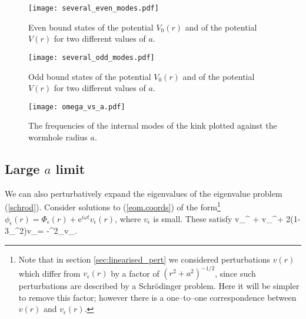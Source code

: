 

\begin{figure}
\texttt{[image: several\_even\_modes.pdf]}
\caption{\label{fig:even_states} Even bound states of the potential $V_0(r)$ and of the potential $V(r)$ for two different values of $a$.}
\end{figure}

\begin{figure}
\texttt{[image: several\_odd\_modes.pdf]}
\caption{\label{fig:odd_states} Odd bound states of the potential $V_0(r)$ and of the potential $V(r)$ for two different values of $a$.}
\end{figure}

\begin{figure}
\texttt{[image: omega\_vs\_a.pdf]}
\caption{\label{fig:omega_vs_a} The frequencies of the internal modes of the kink plotted against the wormhole radius $a$.}
\end{figure}

\subsection{Large $a$ limit}

We can also perturbatively expand the eigenvalues of the eigenvalue problem (\ref{schrod}). Consider solutions to (\ref{eom.coords}) of the form\footnote{Note that in section \ref{sec:linearised_pert} we considered perturbations $v(r)$ which differ from $v_\epsilon(r)$ by a factor of $(r^2+a^2)^{-1/2}$, since such perturbations are described by a Schr\"odinger problem. Here it will be simpler to remove this factor; however there is a one--to--one correspondence between $v(r)$ and $v_\epsilon(r)$.} $\phi_\epsilon(r)=\Phi_\epsilon(r)+\mathrm{e}^{i\omega t}v_\epsilon(r)$, where $v_\epsilon$ is small.
These satisfy
\be
\label{eq:perturbed_large_a}
v_\epsilon^{\prime\prime} + v_\epsilon^\prime + 2(1-3\Phi_\epsilon^2)v_\epsilon = -\omega^2_\epsilon v_\epsilon.
\ee

